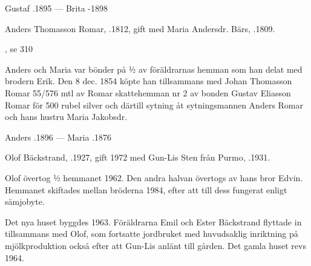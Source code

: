 Gustaf .1895  ---  Brita -1898


%
Anders  Thomasson Romar, .1812, gift med Maria Andersdr. Bärs, .1809.
\begin{jhchildren}
  \item {}, se 310
  \item {}
  \item {}
  \item {}
  \item {}
  \item {}
  \item {}
\end{jhchildren}

Anders och Maria var bönder på ½  av föräldrarnas hemman som han delat med brodern Erik. Den 8 dec. 1854 köpte han tillsammans med Johan Thomasson Romar 55/576 mtl av Romar skattehemman nr 2 av bonden Gustav Eliasson Romar för 500 rubel silver och därtill sytning åt sytningsmannen Anders Romar och hans hustru Maria Jakobsdr.

Anders .1896  ---  Maria  .1876



%



%
Olof Bäckstrand, .1927, gift 1972 med Gun-Lis Sten från Purmo, .1931.

Olof övertog  ½ hemmanet 1962. Den andra  halvan övertogs av hans bror Edvin. Hemmanet skiftades mellan bröderna 1984, efter att till dess fungerat enligt sämjobyte.

Det nya huset byggdes 1963. Föräldrarna Emil och Ester Bäckstrand flyttade in tillsammans med Olof, som fortsatte jordbruket med huvudsaklig inriktning på mjölkproduktion också efter att Gun-Lis anlänt till gården. Det gamla huset revs 1964.

